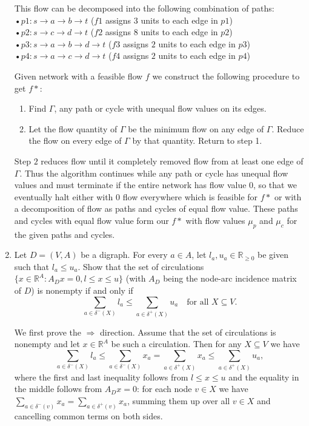 \documentclass[11pt]{article}
\newcommand{\setR}{\mathbb{R}}
\renewcommand{\leq}{\leqslant}
\renewcommand{\geq}{\geqslant}
\begin{document}
\begin{enumerate}[1)]
    
    

This flow can be decomposed into the following combination of paths:\\
•$p1: s →a →b →t$ ($f1$ assigns $3$ units to each edge in $p1$)\\
•$p2: s →c →d →t$ ($f2$ assigns $8$ units to each edge in $p2$)\\
•$p3: s →a →b →d →t$ ($f3$ assigns $2$ units to each edge in $p3$)\\
•$p4: s →a →c →d →t$ ($f4$ assigns $2$ units to each edge in $p4$)


\begin{solution}
Given network with a feasible flow $f$ we construct the following procedure to get $f*$:
\begin{enumerate}
\item Find $Γ$, any path or cycle with unequal flow values on its edges.
\item Let the flow quantity of $Γ$ be the minimum flow on any edge of $Γ$. Reduce the flow on every edge of $Γ$
by that quantity. Return to step 1.
\end{enumerate}
Step $2$ reduces flow until it completely removed flow from at least one edge of $Γ$. Thus the algorithm continues while any path or cycle has unequal flow values and must terminate if the entire network has flow value $0$, so that we eventually halt either with $0$ flow everywhere which is feasible for $f*$ or with a decomposition of flow as paths and cycles of equal flow value. These paths and cycles with equal flow value form our $f*$ with flow values $\mu_p$ and $\mu_c$ for the given paths and cycles.


\end{solution}



\item Let $D= (V,A)$ be a digraph. For every $a∈A$, let $l_a, u_a \in \mathbb{R}_{\geq 0}$ be given such that $l_a \leq u_a$. Show that
the set of circulations $\{x∈\setR^A : A_Dx= 0, l \leq x \leq u \}$ (with $A_D$ being the node-arc incidence matrix of $D$) is nonempty if and only if
$$ \displaystyle\sum_{a \in \delta^-(X)} l_a \leq \displaystyle\sum_{a \in \delta^+(X)} u_a \quad \text{for all }X \subseteq V. $$

\begin{solution}
We first prove the $\Rightarrow$ direction. Assume that the set of circulations is nonempty and let $x\in \mathbb{R}^A$ be such a circulation. Then for any $X\subseteq V$ we have 
\[
\sum_{a \in \delta^-(X)} l_a \leq \sum_{a \in \delta^-(X)} x_a = \sum_{a \in \delta^+(X)} x_a \leq \sum_{a \in \delta^+(X)} u_a,
\]
where the first and last inequality follows from $l\leq x\leq u$ and the equality in the middle follows from $A_D x=0$: for each node $v \in X$ we have $\sum_{a \in \delta^-(v)} x_a = \sum_{a \in \delta^+(v)} x_a$, summing them up over all $v\in X$ and cancelling common terms on both sides.


\end{solution}
\end{enumerate}
\end{document}
